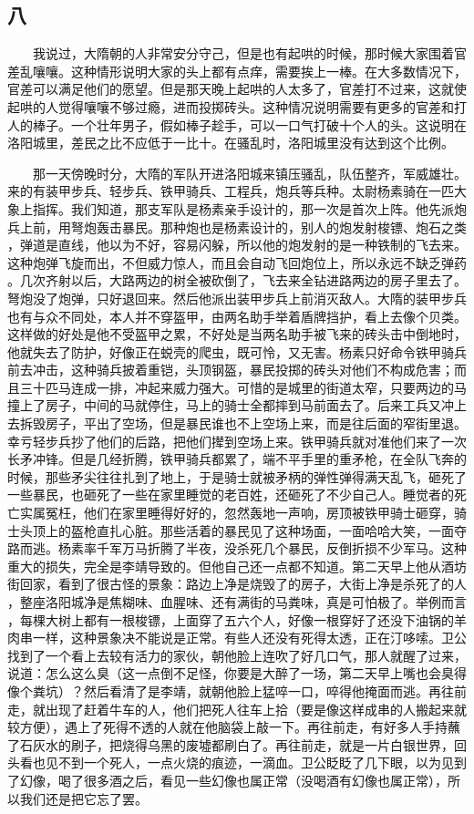  
\subsection{八} 
 
 　　我说过，大隋朝的人非常安分守己，但是也有起哄的时候，那时候大家围着官 差乱嚷嚷。这种情形说明大家的头上都有点痒，需要挨上一棒。在大多数情况下， 官差可以满足他们的愿望。但是那天晚上起哄的人太多了，官差打不过来，这就使 起哄的人觉得嚷嚷不够过瘾，进而投掷砖头。这种情况说明需要有更多的官差和打 人的棒子。一个壮年男子，假如棒子趁手，可以一口气打破十个人的头。这说明在 洛阳城里，差民之比不应低于一比十。在骚乱时，洛阳城里没有达到这个比例。 

　　那一天傍晚时分，大隋的军队开进洛阳城来镇压骚乱，队伍整齐，军威雄壮。 来的有装甲步兵、轻步兵、铁甲骑兵、工程兵，炮兵等兵种。太尉杨素骑在一匹大 象上指挥。我们知道，那支军队是杨素亲手设计的，那一次是首次上阵。他先派炮 兵上前，用弩炮轰击暴民。那种炮也是杨素设计的，别人的炮发射梭镖、炮石之类 ，弹道是直线，他以为不好，容易闪躲，所以他的炮发射的是一种铁制的飞去来。 这种炮弹飞旋而出，不但威力惊人，而且会自动飞回炮位上，所以永远不缺乏弹药 。几次齐射以后，大路两边的树全被砍倒了，飞去来全钻进路两边的房子里去了。 弩炮没了炮弹，只好退回来。然后他派出装甲步兵上前消灭敌人。大隋的装甲步兵 也有与众不同处，本人并不穿盔甲，由两名助手举着盾牌挡护，看上去像个贝类。 这样做的好处是他不受盔甲之累，不好处是当两名助手被飞来的砖头击中倒地时， 他就失去了防护，好像正在蜕壳的爬虫，既可怜，又无害。杨素只好命令铁甲骑兵 前去冲击，这种骑兵披着重铠，头顶钢盔，暴民投掷的砖头对他们不构成危害；而 且三十匹马连成一排，冲起来威力强大。可惜的是城里的街道太窄，只要两边的马 撞上了房子，中间的马就停住，马上的骑士全都摔到马前面去了。后来工兵又冲上 去拆毁房子，平出了空场，但是暴民谁也不上空场上来，而是往后面的窄街里退。 幸亏轻步兵抄了他们的后路，把他们撵到空场上来。铁甲骑兵就对准他们来了一次 长矛冲锋。但是几经折腾，铁甲骑兵都累了，端不平手里的重矛枪，在全队飞奔的 时候，那些矛尖往往扎到了地上，于是骑士就被矛柄的弹性弹得满天乱飞，砸死了 一些暴民，也砸死了一些在家里睡觉的老百姓，还砸死了不少自己人。睡觉者的死 亡实属冤枉，他们在家里睡得好好的，忽然轰地一声响，房顶被铁甲骑士砸穿，骑 士头顶上的盔枪直扎心脏。那些活着的暴民见了这种场面，一面哈哈大笑，一面夺 路而逃。杨素率千军万马折腾了半夜，没杀死几个暴民，反倒折损不少军马。这种 重大的损失，完全是李靖导致的。但他自己还一点都不知道。第二天早上他从酒坊 街回家，看到了很古怪的景象：路边上净是烧毁了的房子，大街上净是杀死了的人 ，整座洛阳城净是焦糊味、血腥味、还有满街的马粪味，真是可怕极了。举例而言 ，每棵大树上都有一根梭镖，上面穿了五六个人，好像一根穿好了还没下油锅的羊 肉串一样，这种景象决不能说是正常。有些人还没有死得太透，正在汀哆嗦。卫公 找到了一个看上去较有活力的家伙，朝他脸上连吹了好几口气，那人就醒了过来， 说道：怎么这么臭（这一点倒不足怪，你要是大醉了一场，第二天早上嘴也会臭得 像个粪坑）？然后看清了是李靖，就朝他脸上猛啐一口，啐得他掩面而逃。再往前 走，就出现了赶着牛车的人，他们把死人往车上拾（要是像这样成串的人搬起来就 较方便），遇上了死得不透的人就在他脑袋上敲一下。再往前走，有好多人手持蘸 了石灰水的刷子，把烧得乌黑的废墟都刷白了。再往前走，就是一片白银世界，回 头看也见不到一个死人，一点火烧的痕迹，一滴血。卫公眨眨了几下眼，以为见到 了幻像，喝了很多酒之后，看见一些幻像也属正常（没喝酒有幻像也属正常），所 以我们还是把它忘了罢。

